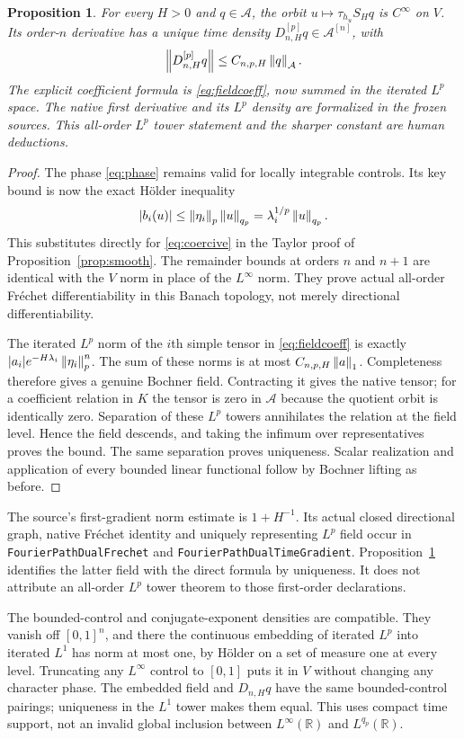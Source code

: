 \documentclass[11pt]{article}
\newtheorem{proposition}[theorem]{Proposition}
\theoremstyle{remark}\newtheorem{remark}[theorem]{Remark}
\newcommand{\R}{\mathbb R}\newcommand{\C}{\mathbb C}
\newcommand{\A}{\mathcal A}\newcommand{\X}{\mathcal X}
\newcommand{\code}[1]{{\small\nolinkurl{#1}}}
\begin{document}
\begin{proposition}\label{prop:dual}
For every $H>0$ and $q\in\A$, the orbit $u\mapsto\tau_{h_u}S_Hq$ is
$C^\infty$ on $V$. Its order-$n$ derivative has a unique time density
$D^{[p]}_{n,H}q\in\A^{[n]}$, with
\[
 \norm{D^{[p]}_{n,H}q}\le C_{n,p,H}\norm q_{\A}.
\]
The explicit coefficient formula is \eqref{eq:fieldcoeff}, now summed
in the iterated $L^p$ space. The native first derivative and its $L^p$
density are formalized in the frozen sources. This all-order $L^p$
tower statement and the sharper constant are human deductions.
\end{proposition}
\begin{proof}
The phase \eqref{eq:phase} remains valid for locally integrable controls.
Its key bound is now the exact H\"older inequality
\[
 |b_i(u)|\le\left\lVert\eta_i\right\rVert_p\left\lVert u\right\rVert_{q_p}
          =\lambda_i^{1/p}\left\lVert u\right\rVert_{q_p}.
\]
This substitutes directly for \eqref{eq:coercive} in the Taylor proof
of Proposition~\ref{prop:smooth}. The remainder bounds at orders
$n$ and $n+1$ are identical with the $V$ norm in place of the
$L^\infty$ norm. They prove actual all-order Fr\'echet differentiability
in this Banach topology, not merely directional differentiability.

The iterated $L^p$ norm of the $i$th simple tensor in
\eqref{eq:fieldcoeff} is exactly
$|a_i|e^{-H\lambda_i}\left\lVert\eta_i\right\rVert_p^n$.
The sum of these norms is at most $C_{n,p,H}\left\lVert a\right\rVert_1$.
Completeness therefore gives a genuine Bochner field. Contracting it
gives the native tensor; for a coefficient relation in $K$ the tensor
is zero in $\A$ because the quotient orbit is identically zero.
Separation of these $L^p$ towers annihilates the relation at the field
level. Hence the field descends, and taking the infimum over
representatives proves the bound. The same separation proves
uniqueness. Scalar realization and application of every bounded
linear functional follow by Bochner lifting as before.
\end{proof}

The source's first-gradient norm estimate is $1+H^{-1}$. Its actual
closed directional graph, native Fr\'echet identity and uniquely
representing $L^p$ field occur in \code{FourierPathDualFrechet} and
\code{FourierPathDualTimeGradient}. Proposition~\ref{prop:dual}
identifies the latter field with the direct formula by uniqueness.
It does not attribute an all-order $L^p$ tower theorem to those
first-order declarations.

The bounded-control and conjugate-exponent densities are compatible.
They vanish off $[0,1]^n$, and there the continuous embedding of
iterated $L^p$ into iterated $L^1$ has norm at most one, by H\"older on
a set of measure one at every level. Truncating any $L^\infty$ control
to $[0,1]$ puts it in $V$ without changing any character phase.
The embedded field and $D_{n,H}q$ have the same bounded-control
pairings; uniqueness in the $L^1$ tower makes them equal. This uses
compact time support, not an invalid global inclusion between
$L^\infty(\R)$ and $L^{q_p}(\R)$.
\end{document}
